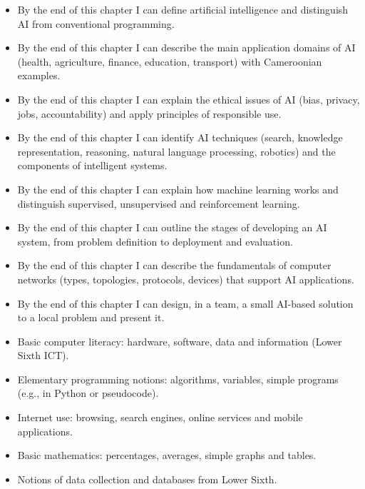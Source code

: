 \documentclass[11pt]{article}
\begin{document}
\begin{objectifs}
\begin{itemize}
\item By the end of this chapter I can define artificial intelligence and distinguish AI from conventional programming.
\item By the end of this chapter I can describe the main application domains of AI (health, agriculture, finance, education, transport) with Cameroonian examples.
\item By the end of this chapter I can explain the ethical issues of AI (bias, privacy, jobs, accountability) and apply principles of responsible use.
\item By the end of this chapter I can identify AI techniques (search, knowledge representation, reasoning, natural language processing, robotics) and the components of intelligent systems.
\item By the end of this chapter I can explain how machine learning works and distinguish supervised, unsupervised and reinforcement learning.
\item By the end of this chapter I can outline the stages of developing an AI system, from problem definition to deployment and evaluation.
\item By the end of this chapter I can describe the fundamentals of computer networks (types, topologies, protocols, devices) that support AI applications.
\item By the end of this chapter I can design, in a team, a small AI-based solution to a local problem and present it.
\end{itemize}
\end{objectifs}

\begin{prerequis}
\begin{itemize}
\item Basic computer literacy: hardware, software, data and information (Lower Sixth ICT).
\item Elementary programming notions: algorithms, variables, simple programs (e.g., in Python or pseudocode).
\item Internet use: browsing, search engines, online services and mobile applications.
\item Basic mathematics: percentages, averages, simple graphs and tables.
\item Notions of data collection and databases from Lower Sixth.
\end{itemize}
\end{prerequis}
\end{document}
